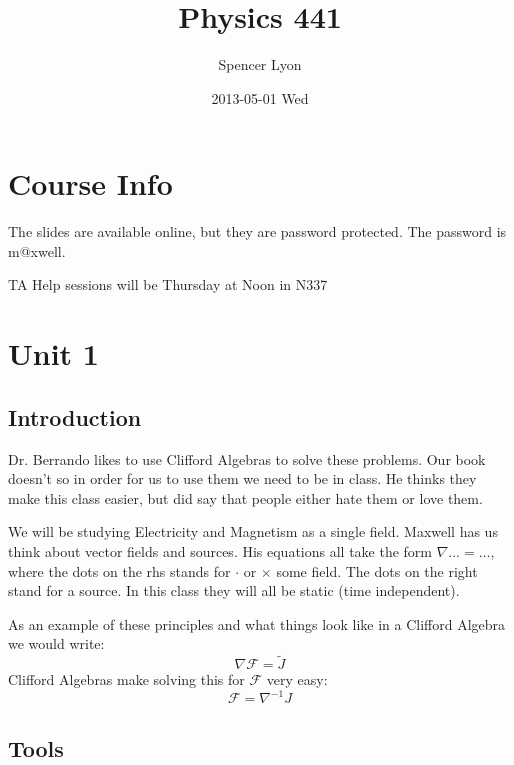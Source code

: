 \documentclass[11pt]{article}
\title{Physics 441}
\author{Spencer Lyon}
\date{2013-05-01 Wed}
\begin{document}
\maketitle

\setcounter{tocdepth}{3}
\tableofcontents
\vspace*{1cm}


\section{Course Info}
\label{sec-1}

The slides are available online, but they are password protected. The password
is m@xwell.

TA Help sessions will be Thursday at Noon in N337
\section{Unit 1}
\label{sec-2}
\subsection{Introduction}
\label{sec-2-1}

Dr. Berrando likes to use Clifford Algebras to solve these problems. Our book
doesn't so in order for us to use them we need to be in class. He thinks they
make this class easier, but did say that people either hate them or love them.

We will be studying Electricity and Magnetism as a single field. Maxwell has us
think about vector fields and sources. His equations all take the form $\nabla
\dots = \dots$, where the dots on the rhs stands for $\cdot$ or $\times$ some
field. The dots on the right stand for a source. In this class they will all be
static (time independent).

As an example of these principles and what things look like in a Clifford
Algebra we would write: $$\nabla \mathscr{F} = \tilde{J}$$ Clifford Algebras
make solving this for $\mathscr{F}$ very easy: $$\mathscr{F}=\nabla^{-1}J$$
\subsection{Tools}
\label{sec-2-2}
\end{document}
